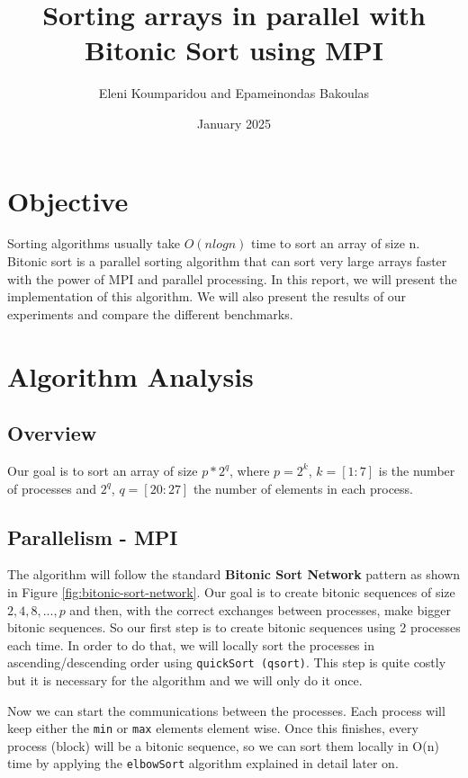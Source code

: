 \documentclass{article}
\title{Sorting arrays in parallel with Bitonic Sort using MPI}
\author{Eleni Koumparidou and Epameinondas Bakoulas}
\date{January 2025}
\begin{document}
\maketitle

\section{Objective}
Sorting algorithms usually take $O(nlogn)$ time to sort an array of size n. Bitonic sort is a parallel sorting 
algorithm that can sort very large arrays faster with the power of MPI and parallel processing. In this report, 
we will present the implementation of this algorithm. We will also present the results of our experiments 
and compare the different benchmarks.

\section{Algorithm Analysis}

\subsection{Overview}

Our goal is to sort an array of size $p * 2^q$, where $p = 2^k$, $k = [1:7]$ is the number of processes 
and $2^q$, $q = [20:27]$ the number of elements in each process.

\subsection{Parallelism - MPI}

The algorithm will follow the standard \textbf{Bitonic Sort Network} pattern as shown in Figure \ref{fig:bitonic-sort-network}.
Our goal is to create bitonic sequences of size $2, 4, 8, ..., p$ and then, with the correct exchanges between
processes, make bigger bitonic sequences. So our first step is to create bitonic sequences using 2 processes each time.
In order to do that, we will locally sort the processes in ascending/descending order using \texttt{quickSort (qsort)}.
This step is quite costly but it is necessary for the algorithm and we will only do it once.

Now we can start the communications between the processes. Each process will keep either the \texttt{min} or
\texttt{max} elements element wise. Once this finishes, every process (block) will be a bitonic sequence, so we can sort 
them locally in O(n) time by applying the \texttt{elbowSort} algorithm explained in detail later on.
\end{document}

